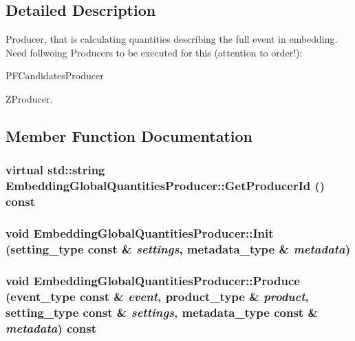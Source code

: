 \subsection{Detailed Description}
Producer, that is calculating quantities describing the full event in embedding. Need follwoing Producers to be executed for this (attention to order!):
\begin{DoxyItemize}
\item PFCandidatesProducer
\item ZProducer. 
\end{DoxyItemize}

\subsection{Member Function Documentation}
\hypertarget{classEmbeddingGlobalQuantitiesProducer_acc5b530d1c375f0508c5b0348e651481}{
\subsubsection[{GetProducerId}]{\setlength{\rightskip}{0pt plus 5cm}virtual std::string EmbeddingGlobalQuantitiesProducer::GetProducerId () const}}
\label{classEmbeddingGlobalQuantitiesProducer_acc5b530d1c375f0508c5b0348e651481}
\hypertarget{classEmbeddingGlobalQuantitiesProducer_a21a081a1b3182777ebf179aded3f0cc7}{
\subsubsection[{Init}]{\setlength{\rightskip}{0pt plus 5cm}void EmbeddingGlobalQuantitiesProducer::Init (setting\_\-type const \& {\em settings}, \/  metadata\_\-type \& {\em metadata})}}
\label{classEmbeddingGlobalQuantitiesProducer_a21a081a1b3182777ebf179aded3f0cc7}
\hypertarget{classEmbeddingGlobalQuantitiesProducer_a05b0572f8e6ba73bc73f3ea0958e5210}{
\subsubsection[{Produce}]{\setlength{\rightskip}{0pt plus 5cm}void EmbeddingGlobalQuantitiesProducer::Produce (event\_\-type const \& {\em event}, \/  product\_\-type \& {\em product}, \/  setting\_\-type const \& {\em settings}, \/  metadata\_\-type const \& {\em metadata}) const}}
\label{classEmbeddingGlobalQuantitiesProducer_a05b0572f8e6ba73bc73f3ea0958e5210}



